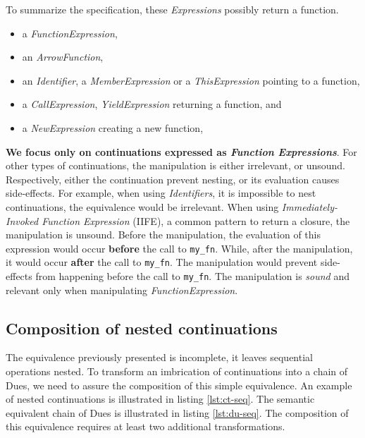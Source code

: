 To summarize the specification, these \textit{Expressions} possibly return a function.
\begin{itemize}
  \item a \textit{FunctionExpression},
  \item an \textit{ArrowFunction},
  \item an \textit{Identifier}, a \textit{MemberExpression} or a \textit{ThisExpression} pointing to a function,
  \item a \textit{CallExpression}, \textit{YieldExpression} returning a function, and
  \item a \textit{NewExpression} creating a new function,
\end{itemize}

\textbf{We focus only on continuations expressed as \textit{Function Expressions}}.
For other types of continuations, the manipulation is either irrelevant, or unsound.
Respectively, either the continuation prevent nesting, or its evaluation causes side-effects.
For example, when using \textit{Identifiers}, it is impossible to nest continuations, the equivalence would be irrelevant.
When using \textit{Immediately-Invoked Function Expression} (IIFE), a common pattern to return a closure, the manipulation is unsound.
Before the manipulation, the evaluation of this expression would occur \textbf{before} the call to \texttt{my_fn}.
While, after the manipulation, it would occur \textbf{after} the call to \texttt{my_fn}.
The manipulation would prevent side-effects from happening before the call to \texttt{my_fn}.
The manipulation is \textit{sound} and relevant only when manipulating \textit{FunctionExpression}.

\subsection{Composition of nested continuations} \label{section:equivalence:composition}

The equivalence previously presented is incomplete, it leaves sequential operations nested.
To transform an imbrication of continuations into a chain of Dues, we need to assure the composition of this simple equivalence.
An example of nested continuations is illustrated in listing \ref{lst:ct-seq}.
The semantic equivalent chain of Dues is illustrated in listing \ref{lst:du-seq}.
The composition of this equivalence requires at least two additional transformations.

